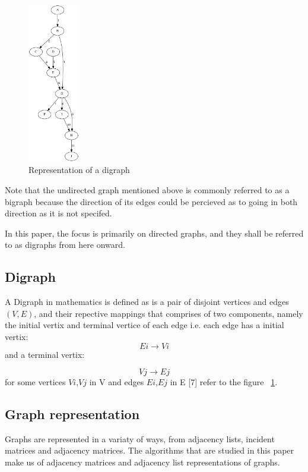 \begin{figure}[H]
  \begin{center}
      \includegraphics[width=0.2\textwidth]{directedgraph.png}
  \end{center}    
  \caption{Representation of a digraph}
  \label{fig:directedgraph}
\end{figure} 

Note that the undirected graph mentioned above is commonly referred to as a bigraph because the direction
of its edges could be percieved as to going in both direction as it is not specifed.

In this paper, the focus is primarily on directed graphs, and they shall be referred to as digraphs from here onward.

\subsection{Digraph}
A Digraph in mathematics is defined as is a pair of disjoint vertices and edges $(V,E)$, and their repective mappings that comprises of two components, namely the initial vertix and 
terminal vertice of each edge i.e. each edge has a initial vertix: 
  \begin{equation}
    Ei\rightarrow Vi
  \end{equation} 
 and a terminal vertix:

  \begin{equation}
    Vj\rightarrow Ej
  \end{equation} 
   for some vertices $Vi$,$Vj$ in V and edges $Ei$,$Ej$ in E [7] refer to the figure ~\ref{fig:directedgraph}.

\subsection{Graph representation}
Graphs are represented in a variaty of ways, from adjacency lists, incident matrices and adjacency matrices. The algorithms that are studied in this paper make us of adjacency matrices and adjacency list representations of graphs. 

